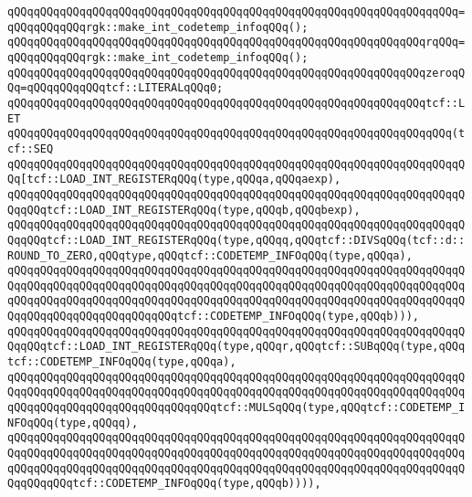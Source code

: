 \verb|qQQqqQQqqQQqqQQqqQQqqQQqqQQqqQQqqQQqqQQqqQQqqQQqqQQqqQQqqQQqqQQqqqQQq=qQQqqQQqqQQqrgk::make_int_codetemp_infoqQQq();|\newline
\verb|qQQqqQQqqQQqqQQqqQQqqQQqqQQqqQQqqQQqqQQqqQQqqQQqqQQqqQQqqQQqqQQqrqQQq=qQQqqQQqqQQqrgk::make_int_codetemp_infoqQQq();|\newline
\newline
\verb|qQQqqQQqqQQqqQQqqQQqqQQqqQQqqQQqqQQqqQQqqQQqqQQqqQQqqQQqqQQqqQQqzeroqQQq=qQQqqQQqqQQqtcf::LITERALqQQq0;|\newline
\newline
\verb|qQQqqQQqqQQqqQQqqQQqqQQqqQQqqQQqqQQqqQQqqQQqqQQqqQQqqQQqqQQqqQQqtcf::LET|\newline
\verb|qQQqqQQqqQQqqQQqqQQqqQQqqQQqqQQqqQQqqQQqqQQqqQQqqQQqqQQqqQQqqQQqqQQq(tcf::SEQ|\newline
\verb|qQQqqQQqqQQqqQQqqQQqqQQqqQQqqQQqqQQqqQQqqQQqqQQqqQQqqQQqqQQqqQQqqQQqqQQq[tcf::LOAD_INT_REGISTERqQQq(type,qQQqa,qQQqaexp),|\newline
\verb|qQQqqQQqqQQqqQQqqQQqqQQqqQQqqQQqqQQqqQQqqQQqqQQqqQQqqQQqqQQqqQQqqQQqqQQqqQQqtcf::LOAD_INT_REGISTERqQQq(type,qQQqb,qQQqbexp),|\newline
\verb|qQQqqQQqqQQqqQQqqQQqqQQqqQQqqQQqqQQqqQQqqQQqqQQqqQQqqQQqqQQqqQQqqQQqqQQqqQQqtcf::LOAD_INT_REGISTERqQQq(type,qQQqq,qQQqtcf::DIVSqQQq(tcf::d::ROUND_TO_ZERO,qQQqtype,qQQqtcf::CODETEMP_INFOqQQq(type,qQQqa),|\newline
\verb|qQQqqQQqqQQqqQQqqQQqqQQqqQQqqQQqqQQqqQQqqQQqqQQqqQQqqQQqqQQqqQQqqQQqqQQqqQQqqQQqqQQqqQQqqQQqqQQqqQQqqQQqqQQqqQQqqQQqqQQqqQQqqQQqqQQqqQQqqQQqqQQqqQQqqQQqqQQqqQQqqQQqqQQqqQQqqQQqqQQqqQQqqQQqqQQqqQQqqQQqqQQqqQQqqQQqqQQqqQQqqQQqqQQqqQQqqQQqtcf::CODETEMP_INFOqQQq(type,qQQqb))),|\newline
\verb|qQQqqQQqqQQqqQQqqQQqqQQqqQQqqQQqqQQqqQQqqQQqqQQqqQQqqQQqqQQqqQQqqQQqqQQqqQQqtcf::LOAD_INT_REGISTERqQQq(type,qQQqr,qQQqtcf::SUBqQQq(type,qQQqtcf::CODETEMP_INFOqQQq(type,qQQqa),|\newline
\verb|qQQqqQQqqQQqqQQqqQQqqQQqqQQqqQQqqQQqqQQqqQQqqQQqqQQqqQQqqQQqqQQqqQQqqQQqqQQqqQQqqQQqqQQqqQQqqQQqqQQqqQQqqQQqqQQqqQQqqQQqqQQqqQQqqQQqqQQqqQQqqQQqqQQqqQQqqQQqqQQqqQQqqQQqqQQqtcf::MULSqQQq(type,qQQqtcf::CODETEMP_INFOqQQq(type,qQQqq),|\newline
\verb|qQQqqQQqqQQqqQQqqQQqqQQqqQQqqQQqqQQqqQQqqQQqqQQqqQQqqQQqqQQqqQQqqQQqqQQqqQQqqQQqqQQqqQQqqQQqqQQqqQQqqQQqqQQqqQQqqQQqqQQqqQQqqQQqqQQqqQQqqQQqqQQqqQQqqQQqqQQqqQQqqQQqqQQqqQQqqQQqqQQqqQQqqQQqqQQqqQQqqQQqqQQqqQQqqQQqqQQqqQQqtcf::CODETEMP_INFOqQQq(type,qQQqb)))),|\newline
